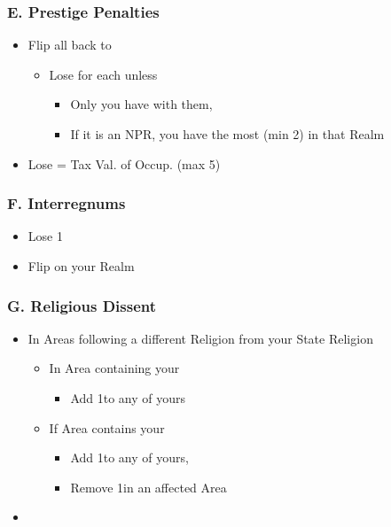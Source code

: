 \documentclass[10pt]{article}
\begin{document}
\subsubsection*{E. Prestige Penalties}
\begin{itemize}
	\item Flip all \disputedsuccession back to \marriage
	\begin{itemize}
		\item Lose  for each unless
		\begin{itemize}
			\item Only you have \alliance with them, 
			\item If it is an NPR, you have the most \influence (min 2) in that Realm
		\end{itemize}
	\end{itemize}
	\item Lose \prestige = Tax Val. of Occup. \towns (max 5)
\end{itemize}

\subsubsection*{F. Interregnums}
\begin{itemize}
	\item Lose 1\stability
	\item Flip \marriages on your Realm
\end{itemize}

\subsubsection*{G. Religious Dissent}
\begin{itemize}
	\item In Areas following a different Religion from your State Religion
	\begin{itemize}
		\item In  Area containing your \towns
		\begin{itemize}
			\item Add 1\unrest to any \town of yours
		\end{itemize}
		\item If  Area contains your \vassals
		\begin{itemize}
			\item Add 1\unrest to any \vassal of yours, 
			\item Remove 1\influence in an affected Area
		\end{itemize}
	\end{itemize}
	\item {}
\end{itemize}
\end{document}
